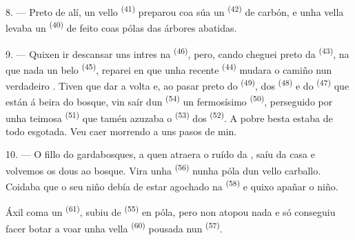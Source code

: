8. --- Preto de alí, un vello  \textsuperscript{(41)} preparou coa
súa  un  \textsuperscript{(42)} de carbón, e unha vella
levaba un  \textsuperscript{(40)} de  feito coas
pólas das árbores abatidas.

\VUsaut{3.0mm}
\VUsaut{3.0mm}

9. --- Quixen ir descansar uns intres na 
\textsuperscript{(46)}, pero, cando cheguei preto da 
\textsuperscript{(43)}, na que nada un belo  \textsuperscript{(45)},
reparei en que unha  recente \textsuperscript{(44)} mudara o
camiño nun verdadeiro . Tiven que dar a volta e, ao pasar preto do
 \textsuperscript{(49)}, dos  \textsuperscript{(48)} e do
 \textsuperscript{(47)} que están á beira do bosque, vin saír dun
 \textsuperscript{(54)} un fermosísimo 
\textsuperscript{(50)}, perseguido por unha teimosa 
\textsuperscript{(51)} que tamén azuzaba o  \textsuperscript{(53)} dos
 \textsuperscript{(52)}. A pobre besta estaba de todo
esgotada. Veu caer morrendo a uns pasos de min.

10. --- O fillo do gardabosques, a quen atraera o ruído da , saíu da
casa e volvemos os dous ao bosque. Vira unha  \textsuperscript{(56)}
nunha póla dun vello carballo. Coidaba que o seu niño debía de estar agochado na
 \textsuperscript{(58)} e quixo apañar o niño.

Áxil coma un  \textsuperscript{(61)}, subiu de 
\textsuperscript{(55)} en póla, pero non atopou nada e só conseguiu facer botar a voar
unha vella  \textsuperscript{(60)} pousada nun 
\textsuperscript{(57)}.
\VUsaut{4.0mm}
\VUfilet{22mm}
